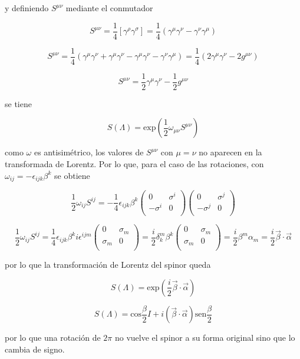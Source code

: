 y definiendo $S^{\mu\nu}$ mediante el conmutador

$$ S^{\mu\nu} = \frac{1}{4}[\gamma^{\rho}\gamma^{\sigma} ] = \frac{1}{4}(\gamma^{\mu}\gamma^{\nu} - \gamma^{\nu}\gamma^{\mu}) $$

$$ S^{\mu\nu} = \frac{1}{4}(\gamma^{\mu}\gamma^{\nu} + \gamma^{\mu}\gamma^{\nu} - \gamma^{\mu}\gamma^{\nu} - \gamma^{\nu}\gamma^{\mu}) = \frac{1}{4}(2\gamma^{\mu}\gamma^{\nu} - 2g^{\mu\nu}) $$

$$ S^{\mu\nu} = \frac{1}{2}\gamma^{\mu}\gamma^{\nu} - \frac{1}{2}g^{\mu\nu} $$

se tiene

$$ S(\Lambda) = \text{exp}\left(\frac{1}{2}\omega_{\mu\nu}S^{\mu\nu}\right) $$

como $\omega$ es antisimétrico, los valores de $S^{\mu\nu}$ con $\mu=\nu$ no aparecen en la transformada de Lorentz. Por lo que, para el caso de las rotaciones, con $\omega_{ij} = -\epsilon_{ijk}\beta^{k} $ se obtiene

$$ \frac{1}{2}\omega_{ij} S^{ij} = -\frac{1}{4} \epsilon_{ijk}\beta^{k} \begin{pmatrix}
    0 & \sigma^{i} \\
    -\sigma^{i} & 0 \\
\end{pmatrix}\begin{pmatrix}
    0 & \sigma^{j} \\
    -\sigma^{j} & 0 \\
\end{pmatrix} $$

$$ \frac{1}{2}\omega_{ij} S^{ij} = \frac{1}{4}\epsilon_{ijk}\beta^{k} i\epsilon^{ijm}\begin{pmatrix}
    0 & \sigma_{m} \\
    \sigma_{m} & 0 \\
\end{pmatrix} = \frac{i}{2}\delta_{k}^{m}\beta^{k}\begin{pmatrix}
    0 & \sigma_{m} \\
    \sigma_{m} & 0 \\
\end{pmatrix} = \frac{i}{2}\beta^{m} \alpha_{m} = \frac{i}{2}\vec{\beta}\cdot \vec{\alpha} $$

por lo que la transformación de Lorentz del spinor queda

$$ S(\Lambda) = \text{exp}\left( \frac{i}{2}\vec{\beta}\cdot\vec{\alpha} \right) $$

$$ S(\Lambda) = \text{cos}\frac{\beta}{2}I + i(\vec{\beta}\cdot\vec{\alpha})\text{sen}\frac{\beta}{2} $$

por lo que una rotación de $2\pi$ no vuelve el spinor a su forma original sino que lo cambia de signo. 